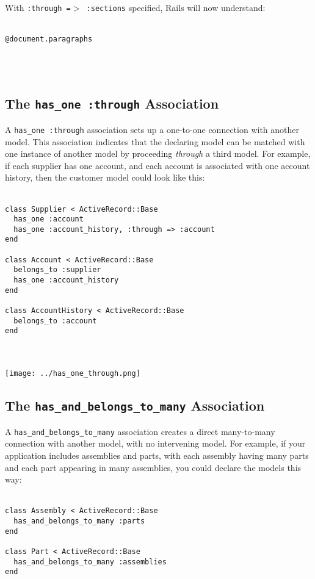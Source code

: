\documentclass[10pt]{book}
\begin{document}
With \texttt{:through =$>$ :sections} specified, Rails will now understand:
\\ \\
\begin{minipage}{\textwidth}{\scriptsize
\begin{verbatim}
@document.paragraphs
\end{verbatim}}
\end{minipage}
\\ \\
\subsection{ The \texttt{has\_one :through} Association}

A \texttt{has\_one :through} association sets up a one-to-one  connection with another model. This association indicates that the  declaring model can be matched with one instance of another model by  proceeding \emph{through} a third model. For example, if each supplier  has one account, and each account is associated with one account  history, then the customer model could look like this:
\\ \\
\begin{minipage}{\textwidth}{\scriptsize
\begin{verbatim}
class Supplier < ActiveRecord::Base
  has_one :account
  has_one :account_history, :through => :account
end
 
class Account < ActiveRecord::Base
  belongs_to :supplier
  has_one :account_history
end
 
class AccountHistory < ActiveRecord::Base
  belongs_to :account
end
\end{verbatim}}
\end{minipage}
\\ \\


\texttt{[image: ../has\_one\_through.png]}

\subsection{ The \texttt{has\_and\_belongs\_to\_many} Association}

A \texttt{has\_and\_belongs\_to\_many} association creates a direct  many-to-many connection with another model, with no intervening model.  For example, if your application includes assemblies and parts, with  each assembly having many parts and each part appearing in many  assemblies, you could declare the models this way:
\\ \\
\begin{minipage}{\textwidth}{\scriptsize
\begin{verbatim}
class Assembly < ActiveRecord::Base
  has_and_belongs_to_many :parts
end
 
class Part < ActiveRecord::Base
  has_and_belongs_to_many :assemblies
end
\end{verbatim}}
\end{minipage}
\\ \\
\end{document}
